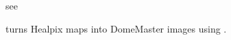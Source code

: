 \renewcommand{\projfullname}{an azimuthal equidistant}
\begin{codedescription}
{}
\end{codedescription}

%
\begin{related}
  \begin{sulist}{} %
  \item[{\ }] see 
  \item[\htmlref{hpx2dm}{idl:hpx2dm}] turns Healpix maps into DomeMaster images
using \thedocid.
  \end{sulist}
\end{related}




\newpage
